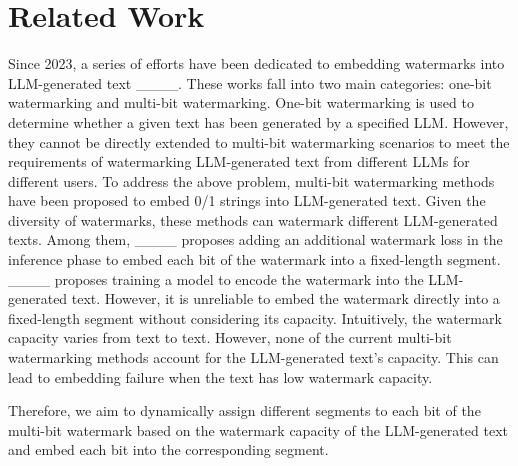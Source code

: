 \section{Related Work}
Since 2023, a series of efforts have been dedicated to embedding watermarks into LLM-generated text ____. These works fall into two main categories: one-bit watermarking and multi-bit watermarking.
One-bit watermarking is used to determine whether a given text has been generated by a specified LLM.
However, they cannot be directly extended to multi-bit watermarking scenarios to meet the requirements of watermarking LLM-generated text from different LLMs for different users.
To address the above problem, multi-bit watermarking methods have been proposed to embed 0/1 strings into LLM-generated text. Given the diversity of watermarks, these methods can watermark different LLM-generated texts. Among them, ____ proposes adding an additional watermark loss in the inference phase to embed each bit of the watermark into a fixed-length segment. ____ proposes training a model to encode the watermark into the LLM-generated text. However, it is unreliable to embed the watermark directly into a fixed-length segment without considering its capacity. Intuitively, the watermark capacity varies from text to text. However, none of the current multi-bit watermarking methods account for the LLM-generated text's capacity. This can lead to embedding failure when the text has low watermark capacity.



Therefore, we aim to dynamically assign different segments to each bit of the multi-bit watermark based on the watermark capacity of the LLM-generated text and embed each bit into the corresponding segment.

